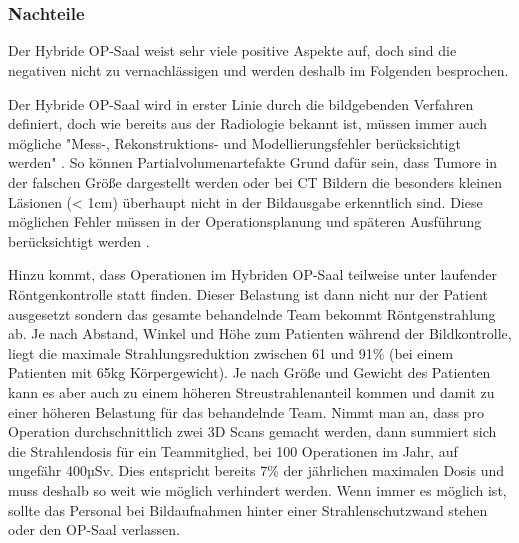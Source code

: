 \chapter{}
\label{sec:overview}

\subsection{Nachteile}

Der Hybride OP-Saal weist sehr viele positive Aspekte auf, doch sind die negativen nicht zu vernachlässigen und werden deshalb im Folgenden besprochen.

Der Hybride OP-Saal wird in erster Linie durch die bildgebenden Verfahren definiert, doch wie bereits aus der Radiologie bekannt ist, müssen immer auch mögliche "Mess-, Rekonstruktions- und Modellierungsfehler berücksichtigt werden" \cite{DerDigitaleOperationssaal}. 
So können Partialvolumenartefakte Grund dafür sein, dass Tumore in der falschen Größe dargestellt werden oder bei CT Bildern die besonders kleinen Läsionen (< 1cm) überhaupt nicht in der Bildausgabe erkenntlich sind. Diese möglichen Fehler müssen in der Operationsplanung und späteren Ausführung berücksichtigt werden \cite{DerDigitaleOperationssaal}.

Hinzu kommt, dass Operationen im Hybriden OP-Saal teilweise unter laufender Röntgenkontrolle statt finden. Dieser Belastung ist dann nicht nur der Patient ausgesetzt sondern das gesamte behandelnde Team bekommt Röntgenstrahlung ab. Je nach Abstand, Winkel und Höhe zum Patienten während der Bildkontrolle, liegt die maximale Strahlungsreduktion zwischen 61 und 91\% (bei einem Patienten mit 65kg Körpergewicht). Je nach Größe und Gewicht des Patienten kann es aber auch zu einem höheren Streustrahlenanteil kommen und damit zu einer höheren Belastung für das behandelnde Team.
Nimmt man an, dass pro Operation durchschnittlich zwei 3D Scans gemacht werden, dann summiert sich die Strahlendosis für ein Teammitglied, bei 100 Operationen im Jahr, auf ungefähr 400µSv. Dies entspricht bereits 7\% der jährlichen maximalen Dosis und muss deshalb so weit wie möglich verhindert werden. Wenn immer es möglich ist, sollte das Personal bei Bildaufnahmen hinter einer Strahlenschutzwand stehen oder den OP-Saal verlassen\cite{RadiationExposure}.

